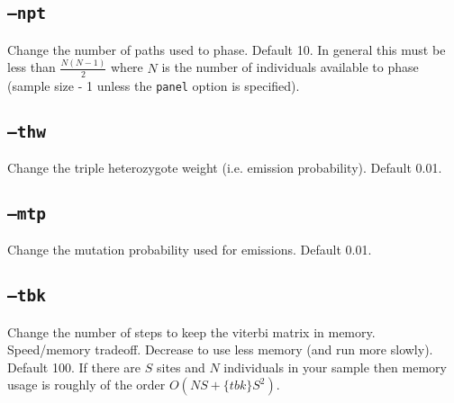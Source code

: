 \documentclass[10pt]{refart}
\begin{document}
\subsection{\texttt{--npt}}
Change the number of paths used to phase. Default 10. In general this
must be less than $\frac{N(N-1)}{2}$ where $N$ is the number of
individuals available to phase (sample size - 1 unless the
\texttt{panel} option is specified).

\subsection{\texttt{--thw}}
Change the triple heterozygote weight (i.e. emission probability). Default 0.01.

\subsection{\texttt{--mtp}}
Change the mutation probability used for emissions. Default 0.01.

\subsection{\texttt{--tbk}}
Change the number of steps to keep the viterbi matrix in
memory. Speed/memory tradeoff. Decrease to use less memory (and run
more slowly). Default 100. If there are $S$ sites and $N$ individuals
in your sample then memory usage is roughly of the order
$O(NS+\{tbk\}S^2)$. 
\end{document}
